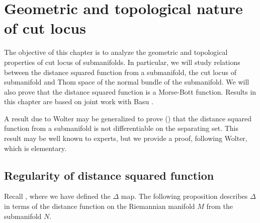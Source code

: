 
\chapter{Geometric and topological nature of cut locus}\label{ch:GeometricViewpointOfCutLocus}
\minitoc
\hf The objective of this chapter is to analyze the geometric and topological properties of cut locus of submanifolds. In particular, we will study relations between the distance squared function from a submanifold, the cut locus of submanifold and Thom space of the normal bundle of the submanifold. We will also prove that the distance squared function is a Morse-Bott function. Results in this chapter are based on joint work with Basu \cite{BaPr21}.

\hf A result due to Wolter \cite[Lemma 1]{Wol79} may be generalized to prove () that the distance squared function from a submanifold is not differentiable on the separating set. This result may be well known to experts, but we provide a proof, following Wolter, which is elementary.

\section{Regularity of distance squared function}\label{sec:RegularityOfDistanceSquaredFunction}
\hfb Recall , where we have defined the $\Delta$ map. The following proposition describes $\Delta$ in terms of the distance function on the Riemannian manifold $M$ from the submanifold $N$.

